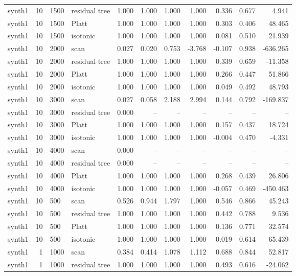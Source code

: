 \begin{tabular}{lrllrrrrrrr}
synth1 & 10 & 1500 & residual tree & 1.000 & 1.000 & 1.000 & 1.000 & 0.336 & 0.677 & 4.941 \\
synth1 & 10 & 1500 & Platt & 1.000 & 1.000 & 1.000 & 1.000 & 0.303 & 0.406 & 48.465 \\
synth1 & 10 & 1500 & isotonic & 1.000 & 1.000 & 1.000 & 1.000 & 0.081 & 0.510 & 21.939 \\
synth1 & 10 & 2000 & scan & 0.027 & 0.020 & 0.753 & -3.768 & -0.107 & 0.938 & -636.265 \\
synth1 & 10 & 2000 & residual tree & 1.000 & 1.000 & 1.000 & 1.000 & 0.339 & 0.659 & -11.358 \\
synth1 & 10 & 2000 & Platt & 1.000 & 1.000 & 1.000 & 1.000 & 0.266 & 0.447 & 51.866 \\
synth1 & 10 & 2000 & isotonic & 1.000 & 1.000 & 1.000 & 1.000 & 0.049 & 0.492 & 48.793 \\
synth1 & 10 & 3000 & scan & 0.027 & 0.058 & 2.188 & 2.994 & 0.144 & 0.792 & -169.837 \\
synth1 & 10 & 3000 & residual tree & 0.000 & -- & -- & -- & -- & -- & -- \\
synth1 & 10 & 3000 & Platt & 1.000 & 1.000 & 1.000 & 1.000 & 0.157 & 0.437 & 18.724 \\
synth1 & 10 & 3000 & isotonic & 1.000 & 1.000 & 1.000 & 1.000 & -0.004 & 0.470 & -4.331 \\
synth1 & 10 & 4000 & scan & 0.000 & -- & -- & -- & -- & -- & -- \\
synth1 & 10 & 4000 & residual tree & 0.000 & -- & -- & -- & -- & -- & -- \\
synth1 & 10 & 4000 & Platt & 1.000 & 1.000 & 1.000 & 1.000 & 0.268 & 0.439 & 26.806 \\
synth1 & 10 & 4000 & isotonic & 1.000 & 1.000 & 1.000 & 1.000 & -0.057 & 0.469 & -450.463 \\
synth1 & 10 & 500 & scan & 0.526 & 0.944 & 1.797 & 1.000 & 0.546 & 0.866 & 45.243 \\
synth1 & 10 & 500 & residual tree & 1.000 & 1.000 & 1.000 & 1.000 & 0.442 & 0.788 & 9.536 \\
synth1 & 10 & 500 & Platt & 1.000 & 1.000 & 1.000 & 1.000 & 0.136 & 0.771 & 32.574 \\
synth1 & 10 & 500 & isotonic & 1.000 & 1.000 & 1.000 & 1.000 & 0.019 & 0.614 & 65.439 \\
synth1 & 1 & 1000 & scan & 0.384 & 0.414 & 1.078 & 1.112 & 0.688 & 0.844 & 52.817 \\
synth1 & 1 & 1000 & residual tree & 1.000 & 1.000 & 1.000 & 1.000 & 0.493 & 0.616 & -24.062 \\

\end{tabular}
